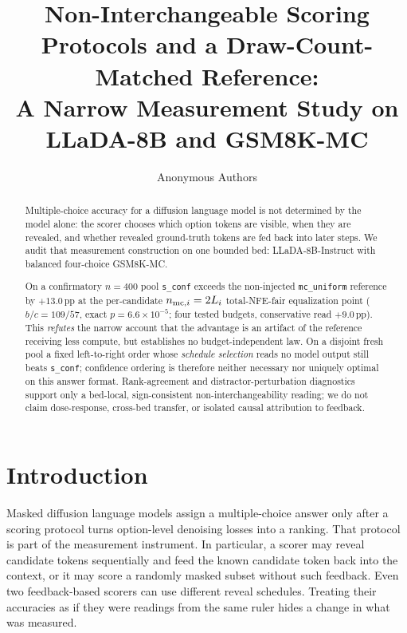 \documentclass{article}
\title{Non-Interchangeable Scoring Protocols and a Draw-Count-Matched Reference:\\
A Narrow Measurement Study on LLaDA-8B and GSM8K-MC}
\author{Anonymous Authors}
\newcommand{\sconf}{\texttt{s\_conf}}
\newcommand{\mcu}{\texttt{mc\_uniform}}
\newcommand{\pp}{\,\mathrm{pp}}
\begin{document}
\maketitle
\thispagestyle{fancy}

\begin{abstract}
Multiple-choice accuracy for a diffusion language model is not determined by
the model alone: the scorer chooses which option tokens are visible, when they
are revealed, and whether revealed ground-truth tokens are fed back into later
steps.  We audit that measurement construction on one bounded bed:
LLaDA-8B-Instruct with balanced four-choice GSM8K-MC.

On a confirmatory $n{=}400$ pool \sconf{} exceeds the non-injected
\mcu{} reference by $+13.0\pp$ at the per-candidate
$n_{{\rm mc},i}=2L_i$ total-NFE-fair equalization point ($b/c=109/57$,
exact $p=6.6\!\times\!10^{-5}$; four tested budgets, conservative read
$+9.0\pp$).  This \emph{refutes} the narrow account that the advantage is
an artifact of the reference receiving less compute, but establishes no
budget-independent law.  On a disjoint fresh pool a fixed left-to-right
order whose \emph{schedule selection} reads no model output still beats
\sconf{}; confidence ordering is therefore neither necessary nor uniquely
optimal on this answer format.  Rank-agreement and distractor-perturbation
diagnostics support only a bed-local, sign-consistent non-interchangeability
reading; we do not claim dose-response, cross-bed transfer, or isolated
causal attribution to feedback.
\end{abstract}

\section{Introduction}
\label{sec:intro}

Masked diffusion language models assign a multiple-choice answer only after a
scoring protocol turns option-level denoising losses into a ranking.  That
protocol is part of the measurement instrument.  In particular, a scorer may
reveal candidate tokens sequentially and feed the known candidate token back
into the context, or it may score a randomly masked subset without such
feedback.  Even two feedback-based scorers can use different reveal schedules.
Treating their accuracies as if they were readings from the same ruler hides a
change in what was measured.
\end{document}
